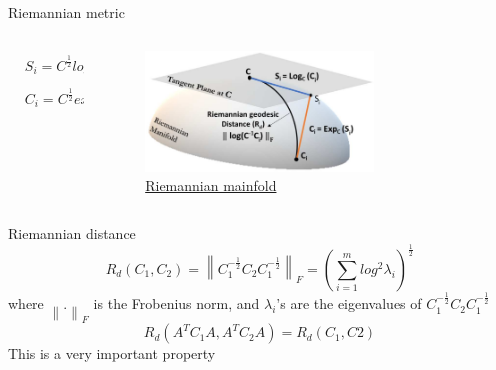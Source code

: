 \documentclass[10pt]{beamer}
\newcommand{\norm}[1]{\left\lVert#1\right\rVert}
\begin{document}
\begin{frame}{Riemannian metric}
    \begin{columns}
        \begin{column}{0.5\textwidth}
          \begin{equation} \nonumber
          \begin{aligned}
          &S_i = C^{\frac{1}{2}}logm(C^{-\frac{1}{2}}C_iC^{-\frac{1}{2}})C^{\frac{1}{2}} \\
          &C_i = C^{\frac{1}{2}}expm(C^{-\frac{1}{2}}S_iC^{-\frac{1}{2}})C^{\frac{1}{2}} \\
          \end{aligned}
           \end{equation}
        \end{column}
        \begin{column}{0.5\textwidth}  %
            \begin{figure}[!htb] 
                \centering 
                \includegraphics[width=0.7\textwidth]{RieDis.png}
                \caption{\href{https://www.mdpi.com/1424-8220/19/2/379}{Riemannian mainfold}} 
            \end{figure}
        \end{column}
    \end{columns}
\end{frame}
\begin{frame}{Riemannian distance}
    \begin{equation}
R_d(C_1,C_2) = \norm{ C_1^{-\frac{1}{2}}C_2C_1^{-\frac{1}{2}}}_F = \left(  \sum_{i=1}^mlog^2\lambda_i  \right)^\frac{1}{2}
    \end{equation} 
    where $\norm{.}_F$ is the Frobenius norm, and $\lambda_i$'s are the eigenvalues  of $ C_1^{-\frac{1}{2}}C_2C_1^{-\frac{1}{2}}$
    \begin{equation}
        R_d(A^TC_1A,A^TC_2A)=R_d(C_1,C2)
    \end{equation}
    This is a very important property
\end{frame}
\end{document}
